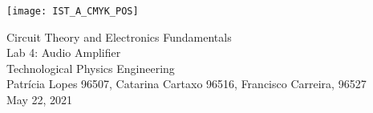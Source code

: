 
\thispagestyle {empty}


\begin{center}
    \texttt{[image: IST\_A\_CMYK\_POS]}
\end{center}


\begin{center}


{\FontLb \Huge Circuit Theory and Electronics Fundamentals} \\ %
\vspace{0.8cm}
{\FontSn \LARGE Lab 4: Audio Amplifier} \\
\vspace{0.5cm}
{\FontSn Technological Physics Engineering} \\ %
\vspace{0.5cm}
{\FontSn \normalsize Patrícia Lopes 96507, Catarina Cartaxo 96516, Francisco Carreira, 96527} \\
\vspace{0.3cm}
{\FontSn \small May 22, 2021} \\ %
\vspace{1cm}
\end{center}


